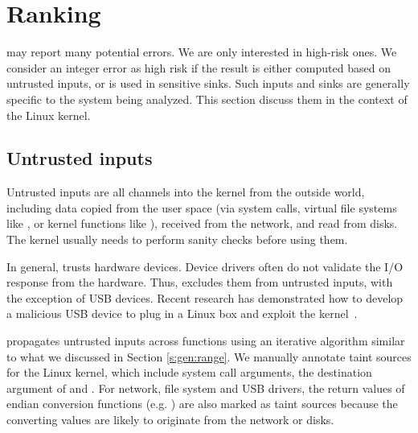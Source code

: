 \section{Ranking}
\label{s:rank}

\sys may report many potential errors.  We are only interested
in high-risk ones.  We consider an integer error as high risk if the
result is either computed based on untrusted inputs, or is used in
sensitive sinks.  Such inputs and sinks are generally specific to
the system being analyzed.  This section discuss them in the context
of the Linux kernel.

\subsection{Untrusted inputs}

Untrusted inputs are all channels into the kernel from the outside world,
including data copied from the user space (via system calls, virtual file
systems like , or kernel functions like ),
received from the network, and read from disks. The kernel usually needs to
perform sanity checks before using them. 

In general, \sys trusts hardware devices. Device drivers often do
not validate the I/O response from the hardware. Thus, \sys excludes them from
untrusted inputs, with the exception of USB devices.  Recent research has
demonstrated how to develop a malicious USB device to plug in a Linux box and
exploit the kernel~\cite{usb:buffer-overflow}.

\sys propagates untrusted inputs across functions using an iterative algorithm
similar to what we discussed in Section \ref{s:gen:range}. We manually annotate
taint sources for the Linux kernel, which include system call arguments, the
destination argument of  and . For network,
file system and USB drivers, the return values of endian conversion functions
(e.g. ) are also marked as taint sources because the
converting values are likely to originate from the network or disks.




